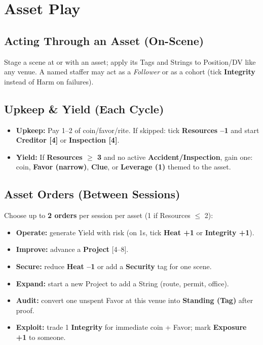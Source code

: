 \documentclass[11pt]{article}
\begin{document}
\section{Asset Play}
\subsection{Acting Through an Asset (On-Scene)}
Stage a scene at or with an asset; apply its Tags and Strings to Position/DV like any venue. A named staffer may act as a \emph{Follower} or as a cohort (tick \textbf{Integrity} instead of Harm on failures).

\subsection{Upkeep \& Yield (Each Cycle)}
\begin{itemize}
  \item \textbf{Upkeep:} Pay 1--2 of coin/favor/rite. If skipped: tick \textbf{Resources --1} and start \textbf{Creditor [4]} or \textbf{Inspection [4]}.
  \item \textbf{Yield:} If \textbf{Resources $\geq$ 3} and no active \textbf{Accident/Inspection}, gain one: coin, \textbf{Favor (narrow)}, \textbf{Clue}, or \textbf{Leverage (1)} themed to the asset.
\end{itemize}

\subsection{Asset Orders (Between Sessions)}
Choose up to \textbf{2 orders} per session per asset (1 if Resources $\leq$ 2):
\begin{itemize}
  \item \textbf{Operate:} generate Yield with risk (on 1s, tick \textbf{Heat +1} or \textbf{Integrity +1}).
  \item \textbf{Improve:} advance a \textbf{Project} [4--8].
  \item \textbf{Secure:} reduce \textbf{Heat --1} or add a \textbf{Security} tag for one scene.
  \item \textbf{Expand:} start a new Project to add a String (route, permit, office).
  \item \textbf{Audit:} convert one unspent Favor at this venue into \textbf{Standing (Tag)} after proof.
  \item \textbf{Exploit:} trade 1 \textbf{Integrity} for immediate coin + Favor; mark \textbf{Exposure +1} to someone.
\end{itemize}
\end{document}
